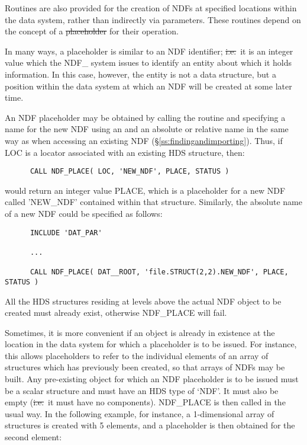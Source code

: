 Routines are also provided for the creation of NDFs at specified locations
within the data system, rather than indirectly via parameters.
These routines depend on the concept of a \st{placeholder\/} for their
operation. 

In many ways, a placeholder is similar to an NDF identifier; \st{i.e.}\ it
is an integer value which the NDF\_ system issues to identify an entity
about which it holds information.
In this case, however, the entity is not a data structure, but a position
within the data system at which an NDF will be created at some later time.

An NDF placeholder may be obtained by calling the routine 
and specifying a name for the new NDF using an  and an absolute or relative name in
the same way as when accessing an existing NDF
(\S\ref{ss:findingandimporting}). Thus, if LOC is a locator associated
with an existing HDS structure, then:

\small
\begin{verbatim}
      CALL NDF_PLACE( LOC, 'NEW_NDF', PLACE, STATUS )
\end{verbatim}
\normalsize

would return an integer value PLACE, which is a placeholder for a new
NDF called 'NEW\_NDF' contained within that structure. Similarly,
the absolute name of a new NDF could be specified as follows:

\small
\begin{verbatim}
      INCLUDE 'DAT_PAR'

      ...

      CALL NDF_PLACE( DAT__ROOT, 'file.STRUCT(2,2).NEW_NDF', PLACE, STATUS )
\end{verbatim}
\normalsize

All the HDS structures residing at levels above the actual NDF object
to be created must already exist, otherwise NDF\_PLACE will fail.

Sometimes, it is more convenient if an object is already in existence
at the location in the data system for which a placeholder is to be
issued.
For instance, this allows placeholders to refer to the individual
elements of an array of structures which has previously been created,
so that arrays of NDFs may be built.
Any pre-existing object for which an NDF placeholder is to be issued
must be a scalar structure and must have an HDS type of `NDF'.
It must also be empty (\st{i.e.}\ it must have no components).
NDF\_PLACE is then called in the usual way.
In the following example, for instance, a 1-dimensional array of
structures is created with 5 elements, and a placeholder is then
obtained for the second element:

